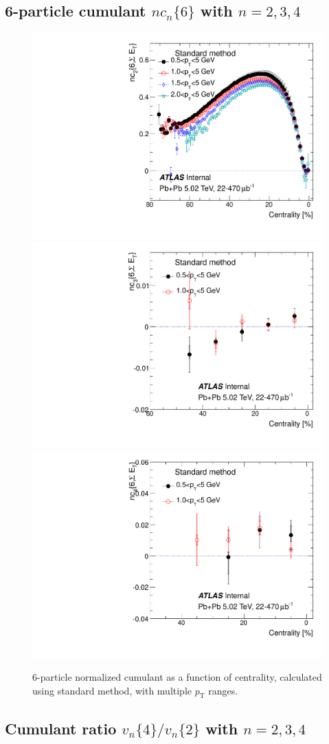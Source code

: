 \subsection{6-particle cumulant $nc_n\{6\}$ with $n=2,3,4$}

\begin{figure}[H]
\centering
\includegraphics[width=.32\linewidth]{figs/sec_paper/comp_nc6_har2_Cent.pdf}
\includegraphics[width=.32\linewidth]{figs/sec_paper/comp_nc6_har3_Cent.pdf}
\includegraphics[width=.32\linewidth]{figs/sec_paper/comp_nc6_har4_Cent.pdf}
\caption{6-particle normalized cumulant as a function of centrality, calculated using standard method, with multiple $p_\text{T}$ ranges.}
\label{fig:paper_nc6}
\end{figure}

\subsection{Cumulant ratio $v_n\{4\}/v_n\{2\}$ with $n=2,3,4$}

